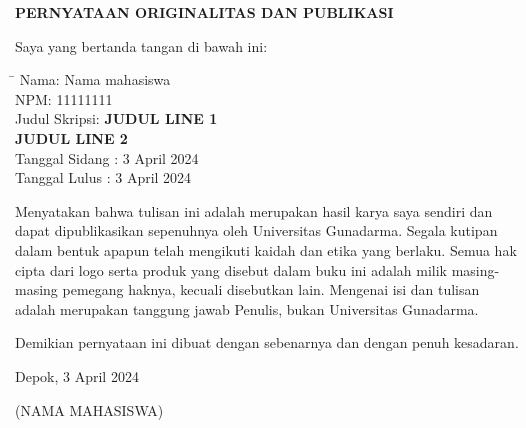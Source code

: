 \newpage %
\begin{center}
\begin{large}\textbf{PERNYATAAN ORIGINALITAS DAN PUBLIKASI}\\\end{large}
\end{center}
\vspace{1cm}


Saya yang bertanda tangan di bawah ini:

\begin{flushleft}
\begin{tabbing}
 \hspace{4cm}\=\kill
  Nama\>: Nama mahasiswa\\
  NPM\>: 11111111 \\
 Judul Skripsi\>: \textbf{JUDUL LINE 1} \\
\> ${}$\hspace{0.65em}\textbf{JUDUL LINE 2} \\

Tanggal Sidang \>: 3 April 2024\\
Tanggal Lulus \>: 3 April 2024 \\
\end{tabbing}

\end{flushleft}

Menyatakan bahwa tulisan ini adalah merupakan hasil karya saya sendiri dan dapat dipublikasikan sepenuhnya oleh Universitas Gunadarma. Segala kutipan dalam bentuk apapun telah mengikuti kaidah dan etika yang berlaku. Semua hak cipta dari logo serta produk yang disebut dalam buku ini adalah milik masing-masing pemegang haknya, kecuali disebutkan lain. Mengenai isi dan  tulisan  adalah merupakan tanggung jawab Penulis, bukan  Universitas Gunadarma. 

Demikian pernyataan ini dibuat dengan sebenarnya dan dengan penuh kesadaran.
\vspace{0.5 cm}
\begin{flushleft}

Depok, 3 April 2024 %

\vspace{1.5 cm}
(NAMA MAHASISWA)
\end{flushleft} 